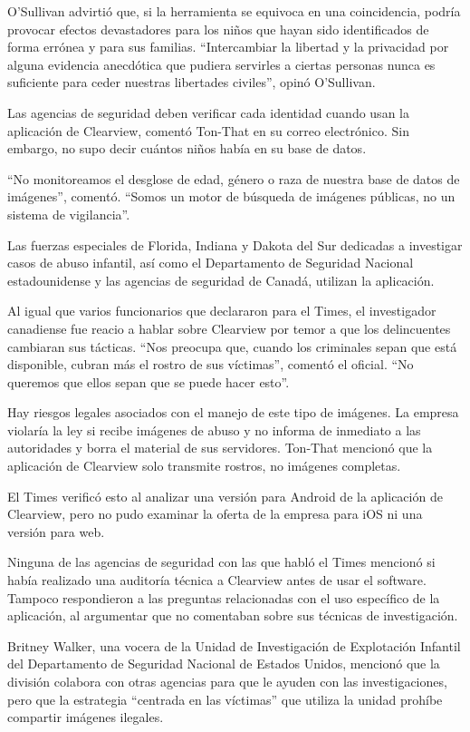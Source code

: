 O'Sullivan advirtió que, si la herramienta se equivoca en una
coincidencia, podría provocar efectos devastadores para los niños que
hayan sido identificados de forma errónea y para sus familias.
``Intercambiar la libertad y la privacidad por alguna evidencia
anecdótica que pudiera servirles a ciertas personas nunca es suficiente
para ceder nuestras libertades civiles'', opinó O'Sullivan.

Las agencias de seguridad deben verificar cada identidad cuando usan la
aplicación de Clearview, comentó Ton-That en su correo electrónico. Sin
embargo, no supo decir cuántos niños había en su base de datos.

``No monitoreamos el desglose de edad, género o raza de nuestra base de
datos de imágenes'', comentó. ``Somos un motor de búsqueda de imágenes
públicas, no un sistema de vigilancia''.

Las fuerzas especiales de Florida, Indiana y Dakota del Sur dedicadas a
investigar casos de abuso infantil, así como el Departamento de
Seguridad Nacional estadounidense y las agencias de seguridad de Canadá,
utilizan la aplicación.

Al igual que varios funcionarios que declararon para el Times, el
investigador canadiense fue reacio a hablar sobre Clearview por temor a
que los delincuentes cambiaran sus tácticas. ``Nos preocupa que, cuando
los criminales sepan que está disponible, cubran más el rostro de sus
víctimas'', comentó el oficial. ``No queremos que ellos sepan que se
puede hacer esto''.

Hay riesgos legales asociados con el manejo de este tipo de imágenes. La
empresa violaría la ley si recibe imágenes de abuso y no informa de
inmediato a las autoridades y borra el material de sus servidores.
Ton-That mencionó que la aplicación de Clearview solo transmite rostros,
no imágenes completas.

El Times verificó esto al analizar una versión para Android de la
aplicación de Clearview, pero no pudo examinar la oferta de la empresa
para iOS ni una versión para web.

Ninguna de las agencias de seguridad con las que habló el Times mencionó
si había realizado una auditoría técnica a Clearview antes de usar el
software. Tampoco respondieron a las preguntas relacionadas con el uso
específico de la aplicación, al argumentar que no comentaban sobre sus
técnicas de investigación.

Britney Walker, una vocera de la Unidad de Investigación de Explotación
Infantil del Departamento de Seguridad Nacional de Estados Unidos,
mencionó que la división colabora con otras agencias para que le ayuden
con las investigaciones, pero que la estrategia ``centrada en las
víctimas'' que utiliza la unidad prohíbe compartir imágenes ilegales.

